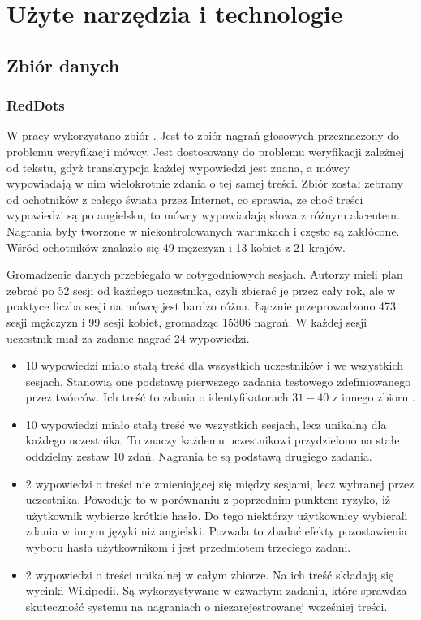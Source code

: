\chapter{Użyte narzędzia i technologie}\label{chap:technologie}

\section{Zbiór danych}\label{sec:zbior_danych}

\subsection{RedDots}

W pracy wykorzystano zbiór \cite{theReddotsDataCollection}.
Jest to zbiór nagrań głosowych przeznaczony do problemu weryfikacji mówcy.
Jest dostosowany do problemu weryfikacji zależnej od tekstu, gdyż transkrypcja każdej wypowiedzi jest znana,
a mówcy wypowiadają w nim wielokrotnie zdania o tej samej treści. Zbiór został zebrany od ochotników z całego
świata przez Internet, co sprawia, że choć treści wypowiedzi są po angielsku, to mówcy wypowiadają słowa
z różnym akcentem. Nagrania były tworzone w niekontrolowanych warunkach i często są zakłócone.
Wśród ochotników znalazło się 49 mężczyzn i 13 kobiet z 21 krajów.

Gromadzenie danych przebiegało w cotygodniowych sesjach. Autorzy mieli plan zebrać po 52 sesji od każdego uczestnika,
czyli zbierać je przez cały rok, ale w praktyce liczba sesji na mówcę jest bardzo różna. Łącznie przeprowadzono
473 sesji mężczyzn i 99 sesji kobiet, gromadząc 15306 nagrań. W każdej sesji uczestnik miał za zadanie nagrać 24 wypowiedzi.

\begin{itemize}
    \item 10 wypowiedzi miało stałą treść dla wszystkich uczestników i we wszystkich sesjach. Stanowią one podstawę
        pierwszego zadania testowego zdefiniowanego przez twórców. Ich treść to zdania o identyfikatorach $31-40$
        z innego zbioru .
    \item 10 wypowiedzi miało stałą treść we wszystkich sesjach, lecz unikalną dla każdego uczestnika. To znaczy
        każdemu uczestnikowi przydzielono na stałe oddzielny zestaw 10 zdań. Nagrania te są podstawą drugiego zadania.
    \item 2 wypowiedzi o treści nie zmieniającej się między sesjami, lecz wybranej przez uczestnika. Powoduje
        to w porównaniu z poprzednim punktem ryzyko, iż użytkownik wybierze krótkie hasło. Do tego niektórzy
        użytkownicy wybierali zdania w innym języki niż angielski. Pozwala to zbadać efekty pozostawienia wyboru hasła
        użytkownikom i jest przedmiotem trzeciego zadani.
    \item 2 wypowiedzi o treści unikalnej w całym zbiorze. Na ich treść składają się wycinki Wikipedii. Są wykorzystywane
        w czwartym zadaniu, które sprawdza skuteczność systemu na nagraniach o niezarejestrowanej wcześniej treści.
\end{itemize}

